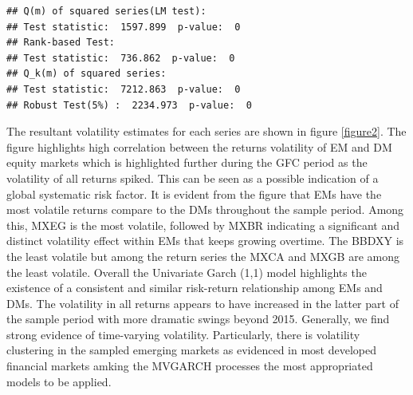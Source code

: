 \documentclass[11pt,preprint, authoryear]{elsarticle}
\numberwithin{equation}{section}
\numberwithin{figure}{section}
\numberwithin{table}{section}
\begin{document}
\begin{verbatim}
## Q(m) of squared series(LM test):  
## Test statistic:  1597.899  p-value:  0 
## Rank-based Test:  
## Test statistic:  736.862  p-value:  0 
## Q_k(m) of squared series:  
## Test statistic:  7212.863  p-value:  0 
## Robust Test(5%) :  2234.973  p-value:  0
\end{verbatim}

The resultant volatility estimates for each series are shown in figure
\ref{figure2}. The figure highlights high correlation between the
returns volatility of EM and DM equity markets which is highlighted
further during the GFC period as the volatility of all returns spiked.
This can be seen as a possible indication of a global systematic risk
factor. It is evident from the figure that EMs have the most volatile
returns compare to the DMs throughout the sample period. Among this,
MXEG is the most volatile, followed by MXBR indicating a significant and
distinct volatility effect within EMs that keeps growing overtime. The
BBDXY is the least volatile but among the return series the MXCA and
MXGB are among the least volatile. Overall the Univariate Garch (1,1)
model highlights the existence of a consistent and similar risk-return
relationship among EMs and DMs. The volatility in all returns appears to
have increased in the latter part of the sample period with more
dramatic swings beyond 2015. Generally, we find strong evidence of
time-varying volatility. Particularly, there is volatility clustering in
the sampled emerging markets as evidenced in most developed financial
markets amking the MVGARCH processes the most appropriated models to be
applied.
\end{document}
